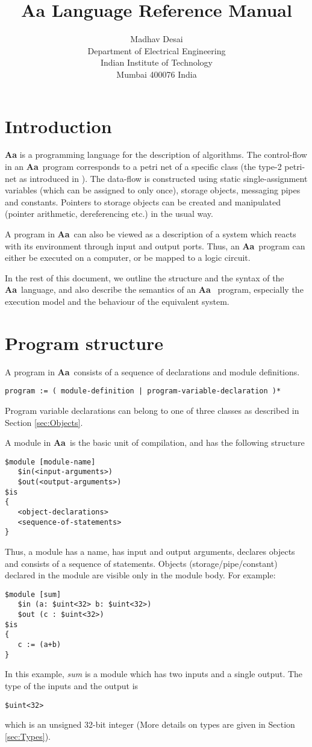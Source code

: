 \documentclass{article}
\title{Aa Language Reference Manual}
\author{Madhav Desai \\ Department of Electrical Engineering \\ Indian Institute of Technology \\
	Mumbai 400076 India}
\newcommand{\Aa}{{\bf Aa}~}
\begin{document}
\maketitle

\section{Introduction}

{\bf Aa} is a programming language for the 
description of algorithms.   The control-flow
in an \Aa program corresponds to a petri net
of a specific class (the type-2 petri-net as
introduced in \cite{ref:SameerPhD}).  
The data-flow is constructed using static
single-assignment variables (which can be assigned to only once),
storage objects, messaging pipes and constants.
Pointers to storage objects can be created
and manipulated (pointer arithmetic, dereferencing
etc.) in the usual way.  

A program in \Aa can also be viewed as a 
description of a system which reacts with 
its environment through input and output ports.
Thus, an \Aa program can either be executed on a 
computer, or be mapped to a logic circuit.

In the rest of this document, we outline the
structure and the syntax of the \Aa language,
and also describe the semantics of an \Aa
program, especially the execution model and
the behaviour of the equivalent system.


\section{Program structure}


A program in \Aa consists of a sequence of
declarations and module definitions.  
\begin{verbatim}
program := ( module-definition | program-variable-declaration )*
\end{verbatim}
Program variable declarations
can belong to one of three classes as described in Section \ref{sec:Objects}.

A module in \Aa is the basic unit of compilation, and
has the following structure
\begin{verbatim}
$module [module-name] 
   $in(<input-arguments>)
   $out(<output-arguments>)
$is
{
   <object-declarations>
   <sequence-of-statements>
}
\end{verbatim}
Thus, a module has a name, has input and output arguments,
declares objects and consists of a sequence of statements.
Objects (storage/pipe/constant) declared in the module are visible only in the
module body.   For example:
\begin{verbatim}
$module [sum] 
   $in (a: $uint<32> b: $uint<32>) 
   $out (c : $uint<32>)
$is
{
   c := (a+b)
}
\end{verbatim}
In this example, {\em sum} is 
a module which has two inputs and a single output.
The type of the inputs and the output is 
\begin{verbatim}
$uint<32>
\end{verbatim}
which is an unsigned 32-bit integer (More details
on types are given in Section \ref{sec:Types}).
\end{document}
